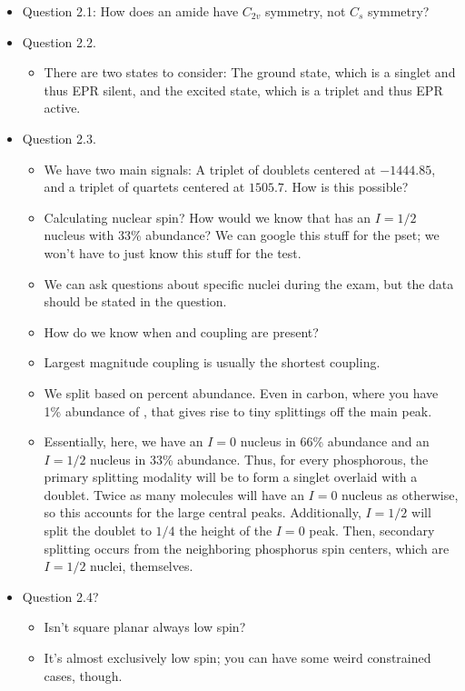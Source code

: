 \documentclass[../notes.tex]{subfiles}
\begin{document}
\begin{itemize}
    \item Question 2.1: How does an amide have $C_{2v}$ symmetry, not $C_s$ symmetry?
    \item Question 2.2.
    \begin{itemize}
        \item There are two states to consider: The ground state, which is a singlet and thus EPR silent, and the excited state, which is a triplet and thus EPR active.
    \end{itemize}
    \item Question 2.3.
    \begin{itemize}
        \item We have two main signals: A triplet of doublets centered at $-1444.85$, and a triplet of quartets centered at $1505.7$. How is this possible?
        \item Calculating nuclear spin? How would we know that  has an $I=1/2$ nucleus with 33\% abundance? We can google this stuff for the pset; we won't have to just know this stuff for the test.
        \item We can ask questions about specific nuclei during the exam, but the data should be stated in the question.
        \item How do we know when  and  coupling are present?
        \item Largest magnitude coupling is usually the shortest coupling.
        \item We split based on percent abundance. Even in carbon, where you have 1\% abundance of , that gives rise to tiny splittings off the main peak.
        \item Essentially, here, we have an $I=0$  nucleus in 66\% abundance and an $I=1/2$  nucleus in 33\% abundance. Thus, for every phosphorous, the primary splitting modality will be to form a singlet overlaid with a doublet. Twice as many molecules will have an $I=0$ nucleus as otherwise, so this accounts for the large central peaks. Additionally, $I=1/2$ will split the doublet to $1/4$ the height of the $I=0$ peak. Then, secondary splitting occurs from the neighboring phosphorus spin centers, which are $I=1/2$ nuclei, themselves.
    \end{itemize}
    \item Question 2.4?
    \begin{itemize}
        \item Isn't square planar always low spin?
        \item It's almost exclusively low spin; you can have some weird constrained cases, though.

\end{itemize}
\end{itemize}
\end{document}
